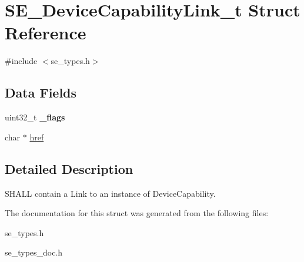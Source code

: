 \hypertarget{structSE__DeviceCapabilityLink__t}{}\section{S\+E\+\_\+\+Device\+Capability\+Link\+\_\+t Struct Reference}
\label{structSE__DeviceCapabilityLink__t}


{\ttfamily \#include $<$se\+\_\+types.\+h$>$}

\subsection*{Data Fields}
\begin{DoxyCompactItemize}
\item 
uint32\+\_\+t {\bfseries \+\_\+flags}
\item 
char $\ast$ \hyperlink{group__DeviceCapabilityLink_ga71815602af62f0ca2267bff4d8c960e1}{href}
\end{DoxyCompactItemize}


\subsection{Detailed Description}
S\+H\+A\+LL contain a Link to an instance of Device\+Capability. 

The documentation for this struct was generated from the following files\+:\begin{DoxyCompactItemize}
\item 
se\+\_\+types.\+h\item 
se\+\_\+types\+\_\+doc.\+h\end{DoxyCompactItemize}
